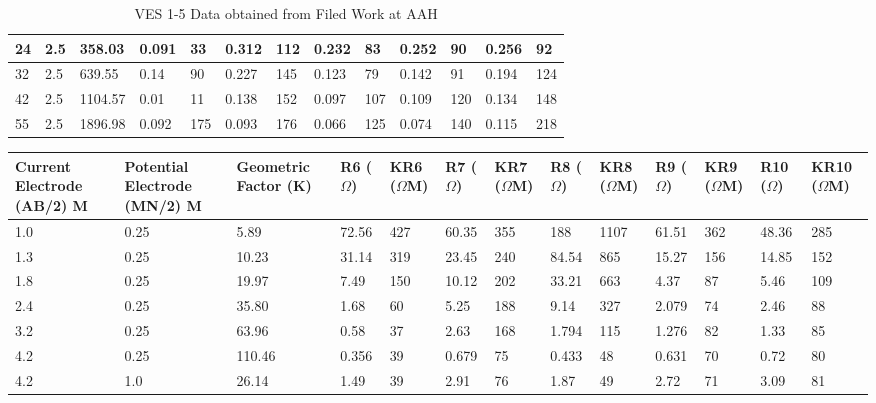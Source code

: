 \documentclass[12pt,a4paper]{report}
\begin{document}
\begin{table}[h!]
\begin{adjustbox}{max width=\textwidth}
\begin{tabular}{|p{2.5cm}|p{2.5cm}|p{2.5cm}|p{1.5cm}|p{1.8cm}|p{1.5cm}|p{1.8cm}|p{1.5cm}|p{1.8cm}|p{1.5cm}|p{1.8cm}|p{1.5cm}|p{1.8cm}|}
    24 & 2.5 & 358.03 & 0.091 & 33 & 0.312 & 112 & 0.232 & 83 & 0.252 & 90 & 0.256 & 92 \\ \hline
    32 & 2.5 & 639.55 & 0.14 & 90 & 0.227 & 145 & 0.123 & 79 & 0.142 & 91 & 0.194 & 124 \\ \hline
    42 & 2.5 & 1104.57 & 0.01 & 11 & 0.138 & 152 & 0.097 & 107 & 0.109 & 120 & 0.134 & 148 \\ \hline
    55 & 2.5 & 1896.98 & 0.092 & 175 & 0.093 & 176 & 0.066 & 125 & 0.074 & 140 & 0.115 & 218 \\ \hline
    \end{tabular}
    \end{adjustbox}
    \caption{VES 1-5 Data obtained from Filed Work at AAH}
    \label{tab:aah_ves-1-5}
\end{table}

\begin{table}[h!]
    \centering
    \begin{adjustbox}{max width=\textwidth}
    \renewcommand{\arraystretch}{1.5}
    \begin{tabular}{|p{2.5cm}|p{2.5cm}|p{2.5cm}|p{1.5cm}|p{1.8cm}|p{1.5cm}|p{1.8cm}|p{1.5cm}|p{1.8cm}|p{1.5cm}|p{1.8cm}|p{1.5cm}|p{1.8cm}|}
    \hline
    \textbf{Current Electrode (AB/2) M} & 
    \textbf{Potential Electrode (MN/2) M} & 
    \textbf{Geometric Factor (K)} & 
    \textbf{R6 ($\Omega$)} & 
    \textbf{KR6 ($\Omega$M)} & 
    \textbf{R7 ($\Omega$)} & 
    \textbf{KR7 ($\Omega$M)} & 
    \textbf{R8 ($\Omega$)} & 
    \textbf{KR8 ($\Omega$M)} & 
    \textbf{R9 ($\Omega$)} & 
    \textbf{KR9 ($\Omega$M)} & 
    \textbf{R10 ($\Omega$)} & 
    \textbf{KR10 ($\Omega$M)} \\ 
    \hline
    1.0 & 0.25 & 5.89 & 72.56 & 427 & 60.35 & 355 & 188 & 1107 & 61.51 & 362 & 48.36 & 285 \\ \hline
    1.3 & 0.25 & 10.23 & 31.14 & 319 & 23.45 & 240 & 84.54 & 865 & 15.27 & 156 & 14.85 & 152 \\ \hline
    1.8 & 0.25 & 19.97 & 7.49 & 150 & 10.12 & 202 & 33.21 & 663 & 4.37 & 87 & 5.46 & 109 \\ \hline
    2.4 & 0.25 & 35.80 & 1.68 & 60 & 5.25 & 188 & 9.14 & 327 & 2.079 & 74 & 2.46 & 88 \\ \hline
    3.2 & 0.25 & 63.96 & 0.58 & 37 & 2.63 & 168 & 1.794 & 115 & 1.276 & 82 & 1.33 & 85 \\ \hline
    4.2 & 0.25 & 110.46 & 0.356 & 39 & 0.679 & 75 & 0.433 & 48 & 0.631 & 70 & 0.72 & 80 \\ \hline
    4.2 & 1.0 & 26.14 & 1.49 & 39 & 2.91 & 76 & 1.87 & 49 & 2.72 & 71 & 3.09 & 81 \\ \hline

\end{tabular}
\end{adjustbox}
\end{table}
\end{document}

